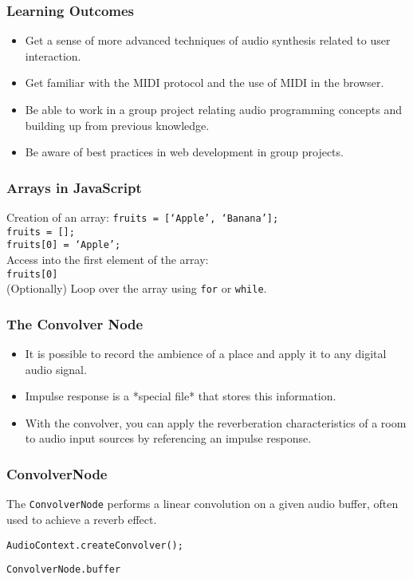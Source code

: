 \documentclass[screen, aspectratio=43]{beamer}
\begin{document}
\begin{frame}
\frametitle{Learning Outcomes}
\begin{itemize}
\item Get a sense of more advanced techniques of audio synthesis related to user interaction.
\item Get familiar with the MIDI protocol and the use of MIDI in the browser.
\item Be able to work in a group project relating audio programming concepts and building up from previous knowledge.
\item Be aware of best practices in web development in group projects.
\end{itemize}
\end{frame}
%
\begin{frame}
\frametitle{Arrays in JavaScript}
Creation of an array:
\texttt{fruits = [`Apple', `Banana'];}\\
\texttt{fruits = [];}\\
\texttt{fruits[0] = `Apple';}\\
\vspace{10 mm}
Access into the first element of the array:\\
\texttt{fruits[0]}\\
\vspace{10 mm}
(Optionally) Loop over the array using \texttt{for} or \texttt{while}.\\
\end{frame}
%
\begin{frame}
\frametitle{The Convolver Node}
\begin{itemize}
\item It is possible to record the ambience of a place and apply it to any digital audio signal.
\item Impulse response is a *special file* that stores this information.
\item With the convolver, you can apply the reverberation characteristics of a room to audio input sources by referencing an impulse response.
\end{itemize}
\end{frame}
%
\begin{frame}
\frametitle{ConvolverNode}
The \texttt{ConvolverNode}  performs a linear convolution on a given audio buffer, often used to achieve a reverb effect.\\
\vspace{10 mm}
\centerline{\texttt{AudioContext.createConvolver();}}
\vspace{2 mm}
\centerline{\texttt{ConvolverNode.buffer}}
\vspace{10 mm}
\end{frame}
\end{document}
